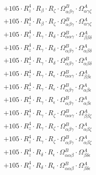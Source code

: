 \documentclass{article}
\begin{document}
\begin{subequations}
\begin{gather}
\begin{array}{c}
 \\[0.2em] 		 + 105 \cdot R_{z}^{4} \cdot R_{\beta{}} \cdot R_{\zeta{}} \cdot \Omega{}^{B}_{\alpha{}\beta{}\gamma{}} \cdot \Omega{}^{A}_{\alpha{}\gamma{}\zeta{}} 
 \\[0.2em] 		 + 105 \cdot R_{z}^{4} \cdot R_{\beta{}} \cdot R_{\zeta{}} \cdot \Omega{}^{B}_{\alpha{}\beta{}\gamma{}} \cdot \Omega{}^{A}_{\alpha{}\gamma{}\zeta{}} 
 \\[0.2em] 		 + 105 \cdot R_{z}^{4} \cdot R_{\gamma{}} \cdot R_{\delta{}} \cdot \Omega{}^{B}_{\alpha{}\alpha{}\gamma{}} \cdot \Omega{}^{A}_{\beta{}\beta{}\delta{}} 
 \\[0.2em] 		 + 105 \cdot R_{z}^{4} \cdot R_{\gamma{}} \cdot R_{\delta{}} \cdot \Omega{}^{B}_{\alpha{}\beta{}\gamma{}} \cdot \Omega{}^{A}_{\alpha{}\beta{}\delta{}} 
 \\[0.2em] 		 + 105 \cdot R_{z}^{4} \cdot R_{\gamma{}} \cdot R_{\delta{}} \cdot \Omega{}^{B}_{\alpha{}\beta{}\gamma{}} \cdot \Omega{}^{A}_{\alpha{}\beta{}\delta{}} 
 \\[0.2em] 		 + 105 \cdot R_{z}^{4} \cdot R_{\gamma{}} \cdot R_{\epsilon{}} \cdot \Omega{}^{B}_{\alpha{}\alpha{}\gamma{}} \cdot \Omega{}^{A}_{\beta{}\beta{}\epsilon{}} 
 \\[0.2em] 		 + 105 \cdot R_{z}^{4} \cdot R_{\gamma{}} \cdot R_{\epsilon{}} \cdot \Omega{}^{B}_{\alpha{}\beta{}\gamma{}} \cdot \Omega{}^{A}_{\alpha{}\beta{}\epsilon{}} 
 \\[0.2em] 		 + 105 \cdot R_{z}^{4} \cdot R_{\gamma{}} \cdot R_{\epsilon{}} \cdot \Omega{}^{B}_{\alpha{}\beta{}\gamma{}} \cdot \Omega{}^{A}_{\alpha{}\beta{}\epsilon{}} 
 \\[0.2em] 		 + 105 \cdot R_{z}^{4} \cdot R_{\gamma{}} \cdot R_{\zeta{}} \cdot \Omega{}^{B}_{\alpha{}\alpha{}\gamma{}} \cdot \Omega{}^{A}_{\beta{}\beta{}\zeta{}} 
 \\[0.2em] 		 + 105 \cdot R_{z}^{4} \cdot R_{\gamma{}} \cdot R_{\zeta{}} \cdot \Omega{}^{B}_{\alpha{}\beta{}\gamma{}} \cdot \Omega{}^{A}_{\alpha{}\beta{}\zeta{}} 
 \\[0.2em] 		 + 105 \cdot R_{z}^{4} \cdot R_{\gamma{}} \cdot R_{\zeta{}} \cdot \Omega{}^{B}_{\alpha{}\beta{}\gamma{}} \cdot \Omega{}^{A}_{\alpha{}\beta{}\zeta{}} 
 \\[0.2em] 		 + 105 \cdot R_{z}^{4} \cdot R_{\delta{}} \cdot R_{\epsilon{}} \cdot \Omega{}^{B}_{\alpha{}\alpha{}\beta{}} \cdot \Omega{}^{A}_{\beta{}\delta{}\epsilon{}} 
 \\[0.2em] 		 + 105 \cdot R_{z}^{4} \cdot R_{\delta{}} \cdot R_{\epsilon{}} \cdot \Omega{}^{B}_{\alpha{}\alpha{}\beta{}} \cdot \Omega{}^{A}_{\beta{}\delta{}\epsilon{}} 

\end{array}
\end{gather}
\end{subequations}
\end{document}
